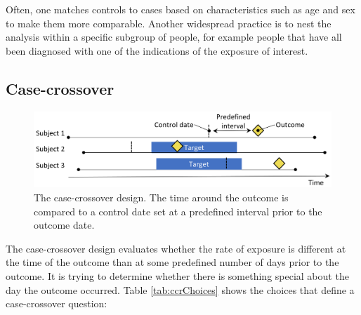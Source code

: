 \documentclass[]{book}
\begin{document}
Often, one matches controls to cases based on characteristics such as
age and sex to make them more comparable. Another widespread practice is
to nest the analysis within a specific subgroup of people, for example
people that have all been diagnosed with one of the indications of the
exposure of interest.

\subsection{Case-crossover}\label{case-crossover}

\begin{figure}

{\centering \includegraphics[width=0.9\linewidth]{images/PopulationLevelEstimation/caseCrossover} 

}

\caption{The case-crossover design. The time around the outcome is compared to a control date set at a predefined interval prior to the outcome date.}\label{fig:caseCrossover}
\end{figure}

The case-crossover \citep{maclure_1991} design evaluates whether the
rate of exposure is different at the time of the outcome than at some
predefined number of days prior to the outcome. It is trying to
determine whether there is something special about the day the outcome
occurred. Table \ref{tab:ccrChoices} shows the choices that define a
case-crossover question:
\end{document}

